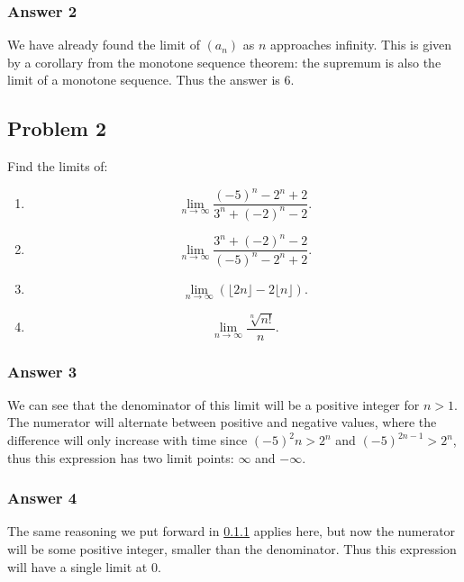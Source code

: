 \documentclass[11pt]{article}
\begin{document}
\subsubsection{Answer 2}
\label{sec-1-1-2}
We have already found the limit of $(a_n)$ as $n$ approaches infinity.  This
is given by a corollary from the monotone sequence theorem: the supremum
is also the limit of a monotone sequence.  Thus the answer is 6.
\subsection{Problem 2}
\label{sec-1-2}
Find the limits of:

\begin{enumerate}
\item \begin{equation*}
  \lim_{n \to \infty} \frac{(-5)^n - 2^n + 2}{3^n + (-2)^n - 2}.
\end{equation*}

\item \begin{equation*}
  \lim_{n \to \infty} \frac{3^n + (-2)^n - 2}{(-5)^n - 2^n + 2}.
\end{equation*}

\item \begin{equation*}
  \lim_{n \to \infty} (\lfloor 2n \rfloor - 2 \lfloor n \rfloor).
\end{equation*}

\item \begin{equation*}
  \lim_{n \to \infty} \frac{\sqrt[n]{n!}}{n}.
\end{equation*}
\end{enumerate}

\subsubsection{Answer 3}
\label{sec-1-2-1}
We can see that the denominator of this limit will be a positive
integer for $n > 1$.  The numerator will alternate between positive
and negative values, where the difference will only increase with
time since $(-5)^2n > 2^n$ and $(-5)^{2n-1} > 2^n$, thus this expression
has two limit points: $\infty$ and $-\infty$.
\subsubsection{Answer 4}
\label{sec-1-2-2}
The same reasoning we put forward in \ref{sec-1-2-1} applies here, but now the
numerator will be some positive integer, smaller than the denominator.
Thus this expression will have a single limit at 0.
\end{document}
